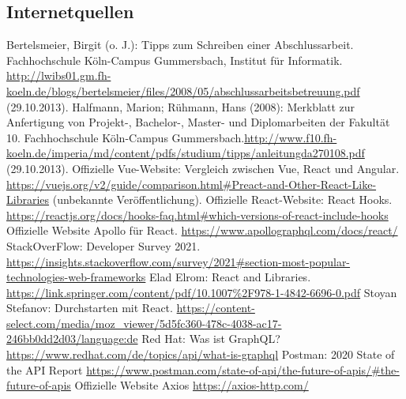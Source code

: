 \documentclass[a4paper,12pt,oneside]{article}
\begin{document}
     \subsection{Internetquellen}
     \begin{thebibliography}{HR08} %
       Bertelsmeier, Birgit (o. J.): Tipps zum Schrei\-b\-en ei\-n\-er Ab\-sch\-luss\-ar\-beit. Fach\-hoch\-schu\-le Köln-Campus Gummersbach, Institut für Informatik. \url{http://lwibs01.gm.fh-koeln.de/blogs/bertelsmeier/files/2008/05/abschlussarbeitsbetreuung.pdf} (29.10.2013).
         Halfmann, Marion; Rühmann, Hans (2008): Merkblatt zur Anfertigung von Projekt-, Bachelor-, Master- und Diplomarbeiten der Fakultät 10. Fachhochschule Köln-Campus Gummersbach.\url{http://www.f10.fh-koeln.de/imperia/md/content/pdfs/studium/tipps/anleitungda270108.pdf} (29.10.2013).
         Offizielle Vue-Website: Vergleich zwischen Vue, React und Angular. \url{https://vuejs.org/v2/guide/comparison.html#Preact-and-Other-React-Like-Libraries} (unbekannte Veröffentlichung).
        Offizielle React-Website: React Hooks. \url{https://reactjs.org/docs/hooks-faq.html#which-versions-of-react-include-hooks}
        Offizielle Website Apollo für React. \url{https://www.apollographql.com/docs/react/}
        StackOverFlow: Developer Survey 2021. \url{https://insights.stackoverflow.com/survey/2021#section-most-popular-technologies-web-frameworks}
        Elad Elrom: React and Libraries. \url{https://link.springer.com/content/pdf/10.1007%2F978-1-4842-6696-0.pdf}
        Stoyan Stefanov: Durchstarten mit React. \url{https://content-select.com/media/moz_viewer/5d5fc360-478c-4038-ac17-246bb0dd2d03/language:de}
        Red Hat: Was ist GraphQL? \url{https://www.redhat.com/de/topics/api/what-is-graphql}
        Postman: 2020 State of the API Report \url{https://www.postman.com/state-of-api/the-future-of-apis/#the-future-of-apis}
        Offizielle Website Axios \url{https://axios-http.com/}



     \end{thebibliography}
  
\end{document}
